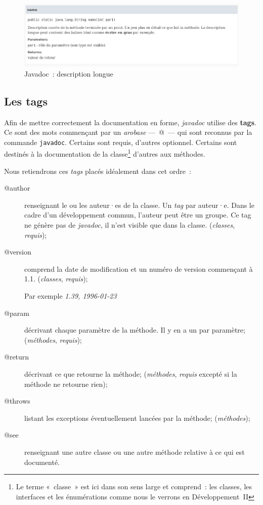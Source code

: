 \begin{figure}[h]
	\centering
	\includegraphics[width=.9\linewidth]{images/javadoc-descriptionlongue.png}
	\caption{Javadoc~: description longue}
	\label{fig:javadocdescriptionlongue}
\end{figure}


\subsection{Les tags}

Afin de mettre correctement la documentation en forme, \textit{javadoc} utilise
des \textbf{tags}. Ce sont des mots commençant par un \textit{arobase} —~@~—
qui sont reconnus par la commande \texttt{javadoc}. Certains sont requis,
d'autres optionnel.  Certains sont destinés à la documentation de la
classe\footnote{Le terme «~classe~» est ici dans son sens large et comprend~:
les classes, les interfaces et les énumérations comme nous le verrons en
Développement~II} d'autres aux méthodes. 

Nous retiendrons ces \textit{tags} placés idéalement dans cet ordre~:

\begin{description}
	\item[@author] renseignant le ou les auteur·es de la classe. Un \textit{tag} 
		par auteur·e. Dans le cadre d'un développement commun, l'auteur peut 
		être un groupe. Ce tag ne génère pas de \textit{javadoc}, il n'est 
		visible que dans la classe. 
		(\textit{classes}, \textit{requis});
	\item[@version] comprend la date de modification et un numéro de version commençant à 1.1. 
		(\textit{classes}, \textit{requis});

		\par Par exemple \textit{1.39, 1996-01-23}
	\item[@param] décrivant chaque paramètre de la méthode. Il y en a un par paramètre;
		(\textit{méthodes}, \textit{requis});
	\item[@return] décrivant ce que retourne la méthode;
		(\textit{méthodes}, \textit{requis} excepté si la méthode ne retourne rien);
	\item[@throws] listant les exceptions éventuellement lancées par la méthode;
		(\textit{méthodes});
	\item[@see] renseignant une autre classe ou une autre méthode relative à ce qui est documenté. 
\end{description}



